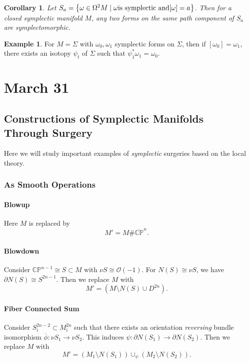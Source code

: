 \documentclass[leqno, openany]{memoir}
\newtheorem{cor}[thm]{Corollary}
\theoremstyle{definition}
\newtheorem{exm}[thm]{Example}
\theoremstyle{remark}
\theoremstyle{plain}
\theoremstyle{definition}
\theoremstyle{remark}
\renewcommand{\C}{\mathbb{C}}
\renewcommand{\P}{\mathbb{P}}
\newcommand{\mc}[1]{\mathcal{#1}}
\begin{document}
    \begin{cor}
        Let $S_a = \qty{\omega \in \Omega^2 M \mid \omega \text{is symplectic and} [\omega] = a}$. Then for a closed symplectic manifold $M$, any two forms on the same path component of $S_a$ are symplectomorphic.
    \end{cor}

    \begin{exm}
        For $M = \Sigma$ with $\omega_0, \omega_1$ symplectic forms on $\Sigma$, then if $[\omega_0] = \omega_1$, there exists an isotopy $\psi_t$ of $\Sigma$ such that $\psi_1^* \omega_1 = \omega_0$.
    \end{exm}

    \chapter{March 31}%
    \label{cha:march_31}
    
    \section{Constructions of Symplectic Manifolds Through Surgery}%
    \label{sec:constructions_of_symplectic_manifolds_through_surgery}
    
    Here we will study important examples of \textit{symplectic} surgeries based on the local theory.

    \subsection{As Smooth Operations}%
    \label{sub:as_smooth_opera}

    \subsubsection{Blowup} 
    Here $M$ is replaced by 
    \[ M' = M \# \overline{\C\P}^n. \]

    \subsubsection{Blowdown}%
    \label{ssub:blowdown}
    
    Consider $\C\P^{n-1} \cong S \subset M$ with $\nu S \cong \mc{O}(-1)$. For $N(S) \cong \nu S$, we have $\partial N(S) \cong S^{2n-1}$. Then we replace $M$ with 
    \[ M' = (M \setminus N(S) \cup D^{2n}). \]

    \subsubsection{Fiber Connected Sum}
    Consider $S_i^{2n-2} \subset M_i^{2n}$ such that there exists an orientation \textit{reversing} bundle isomorphism $\overline{\phi}: \nu S_1 \to \nu S_2$. This induces $\psi: \partial N(S_1) \to \partial N(S_2)$. Then we replace $M$ with
    \[ M' = (M_1 \setminus N(S_1)) \cup_{\psi} (M_2 \setminus N(S_2)). \]
    
\end{document}
